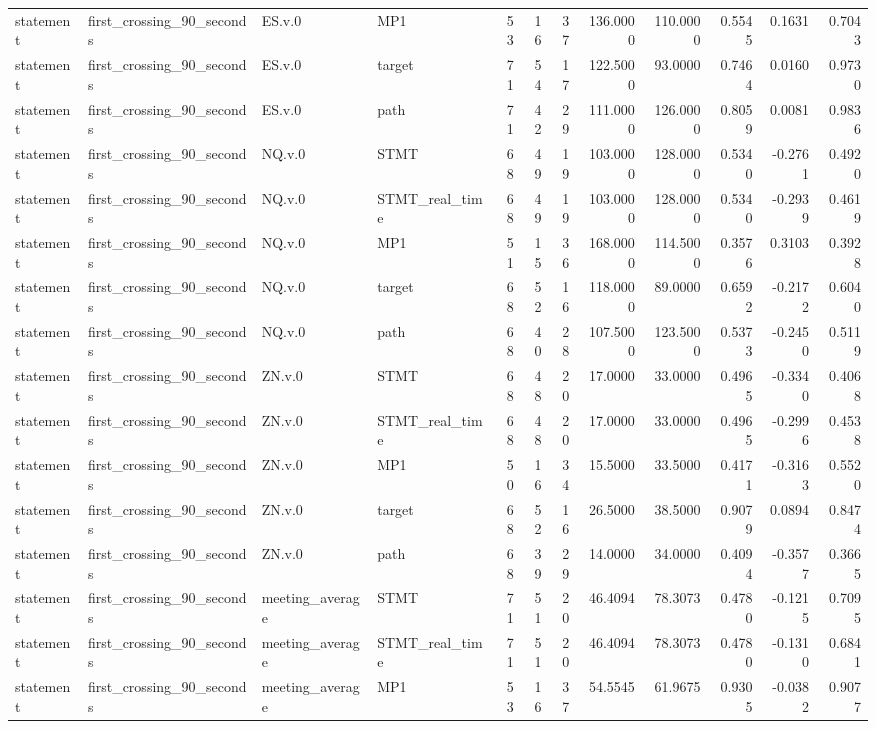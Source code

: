 \begin{tabular}{llllrrrrrrrr}
statement & first_crossing_90_seconds & ES.v.0 & MP1 & 53 & 16 & 37 & 136.0000 & 110.0000 & 0.5545 & 0.1631 & 0.7043 \\
statement & first_crossing_90_seconds & ES.v.0 & target & 71 & 54 & 17 & 122.5000 & 93.0000 & 0.7464 & 0.0160 & 0.9730 \\
statement & first_crossing_90_seconds & ES.v.0 & path & 71 & 42 & 29 & 111.0000 & 126.0000 & 0.8059 & 0.0081 & 0.9836 \\
statement & first_crossing_90_seconds & NQ.v.0 & STMT & 68 & 49 & 19 & 103.0000 & 128.0000 & 0.5340 & -0.2761 & 0.4920 \\
statement & first_crossing_90_seconds & NQ.v.0 & STMT_real_time & 68 & 49 & 19 & 103.0000 & 128.0000 & 0.5340 & -0.2939 & 0.4619 \\
statement & first_crossing_90_seconds & NQ.v.0 & MP1 & 51 & 15 & 36 & 168.0000 & 114.5000 & 0.3576 & 0.3103 & 0.3928 \\
statement & first_crossing_90_seconds & NQ.v.0 & target & 68 & 52 & 16 & 118.0000 & 89.0000 & 0.6592 & -0.2172 & 0.6040 \\
statement & first_crossing_90_seconds & NQ.v.0 & path & 68 & 40 & 28 & 107.5000 & 123.5000 & 0.5373 & -0.2450 & 0.5119 \\
statement & first_crossing_90_seconds & ZN.v.0 & STMT & 68 & 48 & 20 & 17.0000 & 33.0000 & 0.4965 & -0.3340 & 0.4068 \\
statement & first_crossing_90_seconds & ZN.v.0 & STMT_real_time & 68 & 48 & 20 & 17.0000 & 33.0000 & 0.4965 & -0.2996 & 0.4538 \\
statement & first_crossing_90_seconds & ZN.v.0 & MP1 & 50 & 16 & 34 & 15.5000 & 33.5000 & 0.4171 & -0.3163 & 0.5520 \\
statement & first_crossing_90_seconds & ZN.v.0 & target & 68 & 52 & 16 & 26.5000 & 38.5000 & 0.9079 & 0.0894 & 0.8474 \\
statement & first_crossing_90_seconds & ZN.v.0 & path & 68 & 39 & 29 & 14.0000 & 34.0000 & 0.4094 & -0.3577 & 0.3665 \\
statement & first_crossing_90_seconds & meeting_average & STMT & 71 & 51 & 20 & 46.4094 & 78.3073 & 0.4780 & -0.1215 & 0.7095 \\
statement & first_crossing_90_seconds & meeting_average & STMT_real_time & 71 & 51 & 20 & 46.4094 & 78.3073 & 0.4780 & -0.1310 & 0.6841 \\
statement & first_crossing_90_seconds & meeting_average & MP1 & 53 & 16 & 37 & 54.5545 & 61.9675 & 0.9305 & -0.0382 & 0.9077 \\

\end{tabular}
